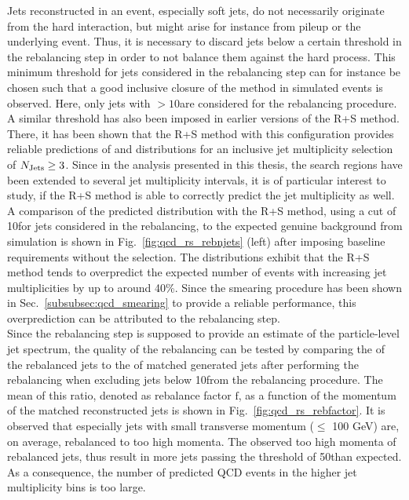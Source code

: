 Jets reconstructed in an event, especially soft jets, do not necessarily originate from the hard interaction, but might arise for instance from pileup or the underlying event. Thus, it is necessary to discard jets below a certain \pt threshold in the rebalancing step in order to not balance them against the hard process. This minimum \pt threshold for jets considered in the rebalancing step can for instance be chosen such that a good inclusive closure of the method in simulated events is observed. Here, only jets with \pt$> 10$\gev are considered for the rebalancing procedure. A similar \pt threshold has also been imposed in earlier versions of the R+S method. There, it has been shown that the R+S method with this configuration provides reliable predictions of \HT and \MHT distributions for an inclusive jet multiplicity selection of $N_{\text{Jets}} \ge 3$. Since in the analysis presented in this thesis, the search regions have been extended to several jet multiplicity intervals, it is of particular interest to study, if the R+S method is able to correctly predict the jet multiplicity as well. \\ 
A comparison of the predicted \NJets distribution with the R+S method, using a \pt cut of 10\gev for jets considered in the rebalancing, to the expected genuine background from simulation is shown in Fig.~\ref{fig:qcd_rs_rebnjets} (left) after imposing baseline requirements without the \MHT selection. The distributions exhibit that the R+S method tends to overpredict the expected number of events with increasing jet multiplicities by up to around 40\%. Since the smearing procedure has been shown in Sec.~\ref{subsubsec:qcd_smearing} to provide a reliable performance, this overprediction can be attributed to the rebalancing step. \\
Since the rebalancing step is supposed to provide an estimate of the particle-level jet spectrum, the quality of the rebalancing can be tested by comparing the \pt of the rebalanced jets to the \pt of matched generated jets after performing the rebalancing when excluding jets below 10\gev from the rebalancing procedure. The mean of this ratio, denoted as rebalance factor $\mathrm{f}$, as a function of the momentum of the matched reconstructed jets is shown in Fig.~\ref{fig:qcd_rs_rebfactor}. It is observed that especially jets with small transverse momentum (\pt $\leq$ 100 GeV) are, on average, rebalanced to too high momenta. The observed too high momenta of rebalanced jets, thus result in more jets passing the \NJets threshold of 50\gev than expected. As a consequence, the number of predicted QCD events in the higher jet multiplicity bins is too large. 
